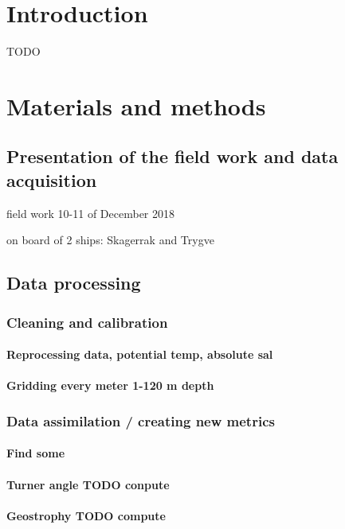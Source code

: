 \documentclass[12pt,a4paper]{article}
\begin{document}
\newpage

\section{\label{sec_intro}Introduction}

TODO

\section{Materials and methods}
\subsection{Presentation of the field work and data acquisition}

field work 10-11 of December 2018

on board of 2 ships: Skagerrak and Trygve

\subsection{Data processing}
\subsubsection{Cleaning and calibration}
\paragraph{Reprocessing data, potential temp, absolute sal}
\paragraph{Gridding every meter 1-120 m depth}

\subsubsection{Data assimilation / creating new metrics}
\paragraph{Find some}
\paragraph{Turner angle TODO conpute}
\paragraph{Geostrophy TODO compute}
\end{document}
